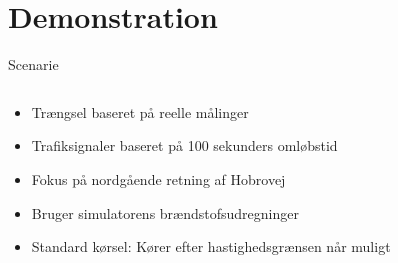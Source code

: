 \section{Demonstration}
\begin{frame}{Scenarie}
\begin{columns}
\begin{column}{0.6\textwidth}
\begin{itemize}
\item Trængsel baseret på reelle målinger
\item Trafiksignaler baseret på 100 sekunders omløbstid
\item Fokus på nordgående retning af Hobrovej
\item Bruger simulatorens brændstofsudregninger
\item Standard kørsel: Kører efter hastighedsgrænsen når muligt
\end{itemize}
\end{column}


\end{columns}
\end{frame}
